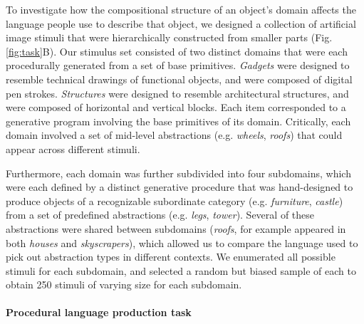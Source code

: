 \documentclass[10pt,letterpaper]{article}
\begin{document}



To investigate how the compositional structure of an object's domain affects the language people use to describe that object, we designed a collection of artificial image stimuli that were hierarchically constructed from smaller parts  (Fig. \ref{fig:task}B).
Our stimulus set consisted of two distinct domains that were each procedurally generated from a set of base primitives.
\textit{Gadgets} were designed to resemble technical drawings of functional objects, and were composed of digital pen strokes.
\textit{Structures} were designed to resemble architectural structures, and were composed of horizontal and vertical blocks.
Each item corresponded to a generative program involving the base primitives of its domain. 
Critically, each domain involved a set of mid-level abstractions  (e.g. \textit{wheels}, \textit{roofs}) that could appear across different stimuli. 

Furthermore, each domain was further subdivided into four subdomains, which were each defined by a distinct generative procedure that was hand-designed to produce objects of a recognizable subordinate category (e.g. \textit{furniture}, \textit{castle}) from a set of predefined abstractions (e.g. \textit{legs}, \textit{tower}).
Several of these abstractions were shared between subdomains (\textit{roofs}, for example appeared in both \textit{houses} and \textit{skyscrapers}), which allowed us to compare the language used to pick out abstraction types in different contexts.
We enumerated all possible stimuli for each subdomain, and selected a random but biased sample of each to obtain 250 stimuli of varying size for each subdomain.


\paragraph{Procedural language production task}
\end{document}
